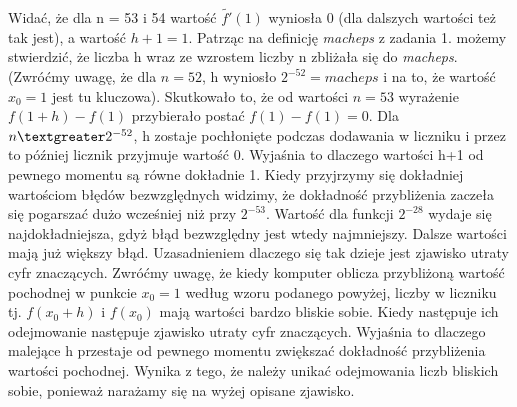 \documentclass[]{article}
\begin{document}
	Widać, że dla n = 53 i 54 wartość $\widetilde{f'}(1)$ wyniosła 0 (dla dalszych wartości też tak jest), a wartość $h + 1 = 1$. Patrząc na definicję \textit{macheps} z zadania 1. możemy stwierdzić, że liczba h wraz ze wzrostem liczby n zbliżała się do \textit{macheps}. (Zwróćmy uwagę, że dla $n = 52$, h wyniosło $2^{-52} = \textit{macheps}$ i na to, że wartość $x_0 = 1$ jest tu kluczowa). Skutkowało to, że od wartości $n = 53$ wyrażenie $f(1 + h) - f(1)$ przybierało postać $f(1) - f(1) = 0$. Dla $n\space \textgreater\space 2^{-52}$, h zostaje pochłonięte podczas dodawania w liczniku i przez to później licznik przyjmuje wartość 0. Wyjaśnia to dlaczego wartości h+1 od pewnego momentu są równe dokładnie 1.\newline
	Kiedy przyjrzymy się dokładniej wartościom błędów bezwzględnych widzimy, że dokładność przybliżenia zaczeła się pogarszać dużo wcześniej niż przy \(2^{-53}\). Wartość dla funkcji \(2^{-28}\) wydaje się najdokładniejsza, gdyż błąd bezwzględny jest wtedy najmniejszy. Dalsze wartości mają już większy błąd.
	Uzasadnieniem dlaczego się tak dzieje jest zjawisko utraty cyfr znaczących. Zwróćmy uwagę, że kiedy komputer oblicza przybliżoną wartość pochodnej w punkcie $x_0 = 1$ według wzoru podanego powyżej, liczby w liczniku tj. $f(x_0 + h)$ i $f(x_0)$ mają wartości bardzo bliskie sobie. Kiedy następuje ich odejmowanie następuje zjawisko utraty cyfr znaczących. 
	Wyjaśnia to dlaczego malejące h przestaje od pewnego momentu zwiększać dokładność przybliżenia wartości pochodnej. Wynika z tego, że należy unikać odejmowania liczb bliskich sobie, ponieważ narażamy się na wyżej opisane zjawisko.
	
	
	
	
\end{document}
